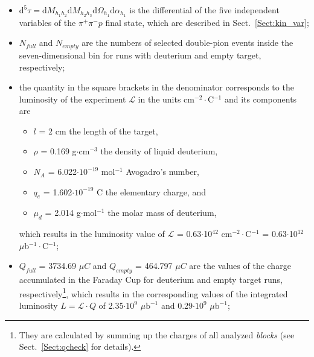 \begin{itemize}
\item $\textrm{d}^{5}\tau = \textrm{d}M_{h_{1}h_{2}} \textrm{d}M_{h_{2}h_{3}} \textrm{d}\Omega_{h_1} \textrm{d}\alpha_{h_1}$ is the differential of the five independent variables of the $\pi^{+}\pi^{-}p$ final state, which are described in Sect.~\ref{Sect:kin_var};\vspace{-0.25em}
\item $N_{full}$ and $N_{empty}$ are the numbers of selected double-pion events inside the seven-dimensional bin for runs with deuterium and empty target, respectively;\vspace{-0.25em} %
\item the quantity in the square brackets in the denominator corresponds to the luminosity of the experiment $\mathcal{L}$ in the units cm$^{-2}\cdot$C$^{-1}$ and its components are\vspace{-0.25em}
\begin{itemize}
\item [ ]  $l$ = 2 cm the length of the target,\vspace{-0.4em}
\item [ ]  $\rho$ = 0.169 g$\cdot$cm$^{-3}$ the density of liquid deuterium,\vspace{-0.4em}
\item [ ]  $N_{A}$ = 6.022$\cdot 10^{-19}$ mol$^{-1}$ Avogadro's number,\vspace{-0.4em}
\item [ ]  $q_{e}$ = 1.602$\cdot 10^{-19}$ C the elementary charge, and \vspace{-0.4em}
\item [ ]  $\mu_{d}$ = 2.014 g$\cdot$mol$^{-1}$ the molar mass of deuterium,\vspace{-0.25em}
\end{itemize}
which results in the luminosity value of $\mathcal{L}$ = 0.63$\cdot$10$^{42}$ cm$^{-2}\cdot$C$^{-1}$ = 0.63$\cdot$10$^{12}$ $\mu$b$^{-1}\cdot$C$^{-1}$;\vspace{-0.25em}


\item $Q_{full}$ = 3734.69 $\mu C$ and $Q_{empty}$ = 464.797 $\mu C$ are the values of the charge accumulated in the Faraday Cup for deuterium and empty target runs, respectively\footnote[11]{They are calculated by summing up the charges of all analyzed \textit{blocks} (see Sect.~\ref{Sect:qcheck} for details).}, which results in the corresponding values of the integrated luminosity $L=\mathcal{L}\cdot Q$ of 2.35$\cdot 10^{9}$ $\mu \text{b}^{-1}$ and 0.29$\cdot 10^{9}$ $\mu \text{b}^{-1}$; \vspace{-0.25em}


\end{itemize}

